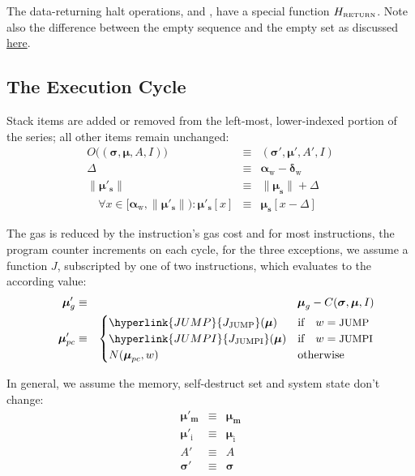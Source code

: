 \documentclass[9pt,oneside]{amsart}
\begin{document}
\begin{multicols}{2}
The data-returning halt operations, \hyperlink{RETURN}{} and , have a special function $H_{\text{\tiny RETURN}}$. Note also the difference between the empty sequence and the empty set as discussed \hyperlink{empty_sequence_vs_empty_set}{here}.

\subsection{The Execution Cycle}

Stack items are added or removed from the left-most, lower-indexed portion of the series; all other items remain unchanged:
\begin{eqnarray}
O\big((\boldsymbol{\sigma}, \boldsymbol{\mu}, A, I)\big) & \equiv & (\boldsymbol{\sigma}', \boldsymbol{\mu}', A', I) \\
\Delta & \equiv & \mathbf{\alpha}_{\mathrm{w}} - \mathbf{\delta}_{\mathrm{w}} \\
\lVert\boldsymbol{\mu}'_{\mathbf{s}}\rVert & \equiv & \lVert\boldsymbol{\mu}_{\mathbf{s}}\rVert + \Delta \\
\quad \forall x \in [\mathbf{\alpha}_{\mathrm{w}}, \lVert\boldsymbol{\mu}'_{\mathbf{s}}\rVert): \boldsymbol{\mu}'_{\mathbf{s}}[x] & \equiv & \boldsymbol{\mu}_{\mathbf{s}}[x-\Delta]
\end{eqnarray}

The gas is reduced by the instruction's gas cost and for most instructions, the program counter increments on each cycle, for the three exceptions, we assume a function $J$, subscripted by one of two instructions, which evaluates to the according value:
\begin{eqnarray}
\quad \boldsymbol{\mu}'_{g} & \equiv & \boldsymbol{\mu}_{g} - C(\boldsymbol{\sigma}, \boldsymbol{\mu}, I) \label{eq:mu_pc}\\
\quad \boldsymbol{\mu}'_{pc} & \equiv & \begin{cases}
\hyperlink{JUMP}{J_{\text{JUMP}}}(\boldsymbol{\mu}) & \text{if} \quad w = \text{\small JUMP} \\
\hyperlink{JUMPI}{J_{\text{JUMPI}}}(\boldsymbol{\mu}) & \text{if} \quad w = \text{\small JUMPI} \\
N(\boldsymbol{\mu}_{pc}, w) & \text{otherwise}
\end{cases}
\end{eqnarray}

In general, we assume the memory, self-destruct set and system state don't change:
\begin{eqnarray}
\boldsymbol{\mu}'_{\mathbf{m}} & \equiv & \boldsymbol{\mu}_{\mathbf{m}} \\
\boldsymbol{\mu}'_{\mathrm{i}} & \equiv & \boldsymbol{\mu}_{\mathrm{i}} \\
A' & \equiv & A \\
\boldsymbol{\sigma}' & \equiv & \boldsymbol{\sigma}
\end{eqnarray}


\end{multicols}
\end{document}
